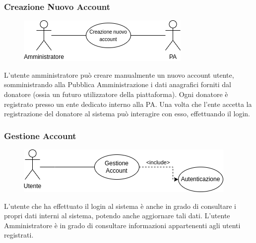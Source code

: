 \documentclass{article}
\begin{document}
\subsubsection{Creazione Nuovo Account}\label{rf_7}
\begin{description}
	
	\begin{figure}[htp]
		\centering
		\includegraphics[]{rf7.png}
	\end{figure}
	
	\item L'utente amministratore può creare manualmente un nuovo account utente, somministrando alla Pubblica Amministrazione i dati anagrafici forniti dal donatore (ossia un futuro utilizzatore della piattaforma). Ogni donatore è registrato presso un ente dedicato interno alla PA. Una volta che l'ente accetta la registrazione del donatore al sistema può interagire con esso, effettuando il login.
\end{description}

\clearpage

\renewcommand\thesubsubsection{RF 8}
\subsubsection{Gestione Account}\label{rf_8}
\begin{description}
	
	\begin{figure}[htp]
		\centering
		\includegraphics[]{rf8.png}
	\end{figure}	
		
	\item L'utente che ha effettuato il login al sistema è anche in grado di consultare i propri dati interni al sistema, potendo anche aggiornare tali dati. L'utente Amministratore è in grado di consultare informazioni appartenenti agli utenti registrati.
\end{description}

\renewcommand\thesubsubsection{RF 9}
\end{document}
